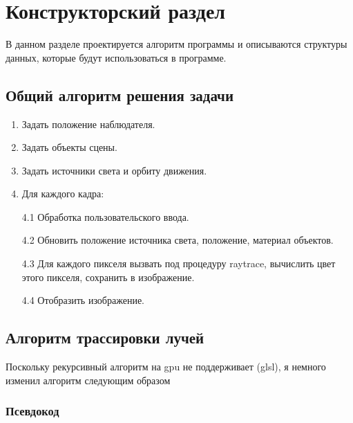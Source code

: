 \chapter{Конструкторский раздел}
\label{cha:design}

В данном разделе проектируется алгоритм программы и описываются структуры данных, которые будут использоваться в программе.

\section{Общий алгоритм решения задачи}

\begin{enumerate}
\item Задать положение наблюдателя.

\item Задать объекты сцены.

\item Задать источники света и орбиту движения.

\item Для каждого кадра:

4.1 Обработка пользовательского ввода.

4.2 Обновить положение источника света, положение, материал объектов.

4.3 Для каждого пикселя вызвать под процедуру raytrace, вычислить цвет этого пикселя, сохранить в изображение.

4.4 Отобразить изображение.
\end{enumerate}


\section{Алгоритм трассировки лучей}


Поскольку рекурсивный алгоритм на gpu не поддерживает (glsl), я немного изменил алгоритм следующим образом


\subsection*{Псевдокод}

